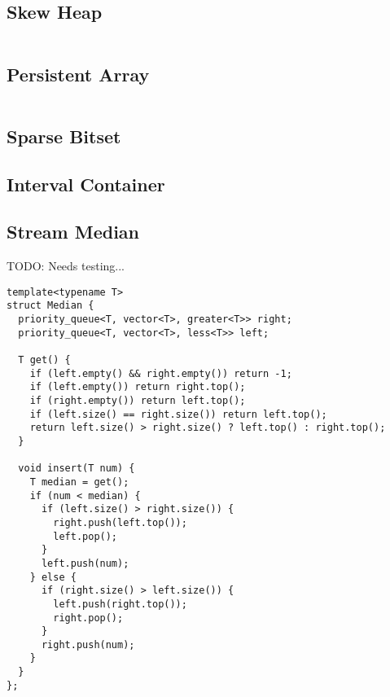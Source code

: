 \subsection{Skew Heap}

\hrulefill \vspace{-\baselineskip}
\begin{multicols}{2}
\inputminted[autogobble,fontsize=\tiny]{C++}{Data Structures/skew_heap.cpp}
\end{multicols}
\vspace{-\baselineskip}
\noindent \hrulefill

\newpage

\subsection{Persistent Array}

\hrulefill \vspace{-\baselineskip}
\begin{multicols}{2}
\inputminted[autogobble,fontsize=\tiny]{C++}{Data Structures/persistant_array.cpp}
\end{multicols}
\vspace{-\baselineskip}
\noindent \hrulefill

\subsection{Sparse Bitset}
\subsection{Interval Container}
\subsection{Stream Median}

TODO: Needs testing...

\begin{lstlisting}
template<typename T>
struct Median {
  priority_queue<T, vector<T>, greater<T>> right;
  priority_queue<T, vector<T>, less<T>> left;
  
  T get() {
    if (left.empty() && right.empty()) return -1;
    if (left.empty()) return right.top();
    if (right.empty()) return left.top();
    if (left.size() == right.size()) return left.top();
    return left.size() > right.size() ? left.top() : right.top();
  }

  void insert(T num) {
    T median = get();
    if (num < median) {
      if (left.size() > right.size()) {
        right.push(left.top());
        left.pop();
      }
      left.push(num);
    } else {
      if (right.size() > left.size()) {
        left.push(right.top());
        right.pop();
      }
      right.push(num);
    }
  }
};

\end{lstlisting}

